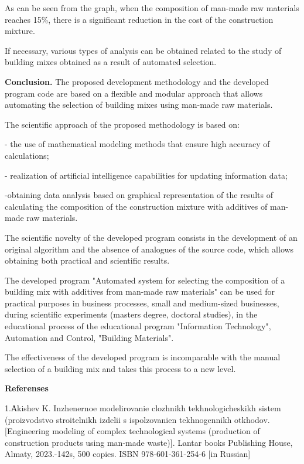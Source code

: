 \documentclass[
]{article}
\begin{document}
As can be seen from the graph, when the composition of man-made raw
materials reaches 15\%, there is a significant reduction in the cost of
the construction mixture.

If necessary, various types of analysis can be obtained related to the
study of building mixes obtained as a result of automated selection.

\textbf{Conclusion.} The proposed development methodology and the
developed program code are based on a flexible and modular approach that
allows automating the selection of building mixes using man-made raw
materials.

The scientific approach of the proposed methodology is based on:

- the use of mathematical modeling methods that ensure high accuracy of
calculations;

- realization of artificial intelligence capabilities for updating
information data;

-obtaining data analysis based on graphical representation of the
results of calculating the composition of the construction mixture with
additives of man-made raw materials.

The scientific novelty of the developed program consists in the
development of an original algorithm and the absence of analogues of the
source code, which allows obtaining both practical and scientific
results.

The developed program "Automated system for selecting the composition of
a building mix with additives from man-made raw materials" can be used
for practical purposes in business processes, small and medium-sized
businesses, during scientific experiments (master\textquotesingle s
degree, doctoral studies), in the educational process of the educational
program "Information Technology", Automation and Control, "Building
Materials".

The effectiveness of the developed program is incomparable with the
manual selection of a building mix and takes this process to a new
level.

\textbf{Referenses}

1.Аkishev K. Inzhenernoe modelirovanie clozhnikh tekhnologicheskikh
sistem (proizvodstvo stroitelnikh izdelii s ispolzovanien tekhnogennikh
otkhodov. {[}Engineering modeling of complex technological systems
(production of construction products using man-made waste){]}. Lantar
books Publishing House, Almaty, 2023.-142s, 500 copies. ISBN
978-601-361-254-6 {[}in Russian{]}
\end{document}
